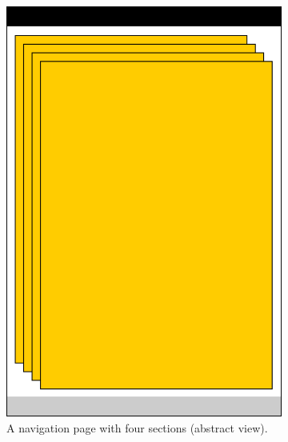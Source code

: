 \documentclass[a4paper,oneside]{book}
\begin{document}
\begin{figure}[ht]
\begin{subfigure}[t]{0.22\textwidth}
        \includegraphics[width=\textwidth]{nav_page.png}
        \caption{A navigation page with four sections (abstract view).}
        \label{fig.nav_page}
    \end{subfigure}
    ~
    \begin{subfigure}[t]{0.22\textwidth}

\end{subfigure}
\end{figure}
\end{document}
